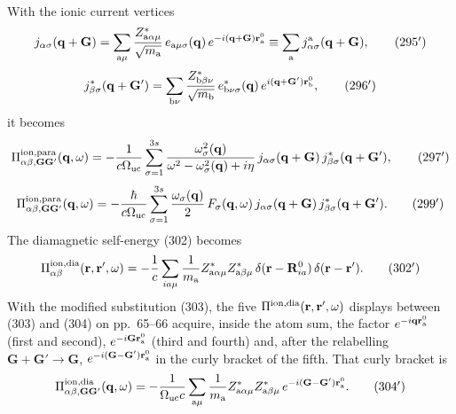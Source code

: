 \documentclass[11pt]{article}
\begin{document}
With the ionic current vertices
\begin{equation*}
j_{\alpha\sigma}(\mathbf q+\mathbf G)=\sum_{{\rm a}\mu}\frac{Z^*_{{\rm a}\alpha\mu}}{\sqrt{m_{\rm a}}}\,
e_{{\rm a}\mu\sigma}(\mathbf q)\,e^{-i(\mathbf q+\mathbf G)\mathbf r^0_{\rm a}}
\equiv\sum_{\rm a}j^{\rm a}_{\alpha\sigma}(\mathbf q+\mathbf G),\tag{295$'$}
\end{equation*}
\begin{equation*}
j^*_{\beta\sigma}(\mathbf q+\mathbf G')=\sum_{{\rm b}\nu}\frac{Z^*_{{\rm b}\beta\nu}}{\sqrt{m_{\rm b}}}\,
e^*_{{\rm b}\nu\sigma}(\mathbf q)\,e^{i(\mathbf q+\mathbf G')\mathbf r^0_{\rm b}},\tag{296$'$}
\end{equation*}
it becomes
\begin{equation*}
\Pi^{\rm ion,para}_{\alpha\beta,\mathbf G\mathbf G'}(\mathbf q,\omega)=-\frac{1}{c\Omega_{\rm uc}}
\sum_{\sigma=1}^{3s}\frac{\omega^2_\sigma(\mathbf q)}{\omega^2-\omega^2_\sigma(\mathbf q)+i\eta}\,
j_{\alpha\sigma}(\mathbf q+\mathbf G)\,j^*_{\beta\sigma}(\mathbf q+\mathbf G'),\tag{297$'$}
\end{equation*}
\begin{equation*}
\Pi^{\rm ion,para}_{\alpha\beta,\mathbf G\mathbf G'}(\mathbf q,\omega)=-\frac{\hbar}{c\Omega_{\rm uc}}
\sum_{\sigma=1}^{3s}\frac{\omega_\sigma(\mathbf q)}{2}\,F_\sigma(\mathbf q,\omega)\,
j_{\alpha\sigma}(\mathbf q+\mathbf G)\,j^*_{\beta\sigma}(\mathbf q+\mathbf G').\tag{299$'$}
\end{equation*}
The diamagnetic self-energy (302) becomes
\begin{equation*}
\Pi^{\rm ion,dia}_{\alpha\beta}(\mathbf r,\mathbf r',\omega)=-\frac1c\sum_{ia\mu}\frac{1}{m_{\rm a}}
Z^*_{{\rm a}\alpha\mu}Z^*_{{\rm a}\beta\mu}\,\delta(\mathbf r-\mathbf R^0_{ia})\,\delta(\mathbf r-\mathbf r').\tag{302$'$}
\end{equation*}
With the modified substitution (303), the five $\Pi^{\rm ion,dia}(\mathbf r,\mathbf r',\omega)$ displays
between (303) and (304) on pp.~65--66 acquire, inside the atom sum, the factor
$e^{-i\mathbf q\mathbf r^0_{\rm a}}$ (first and second), $e^{-i\mathbf G\mathbf r^0_{\rm a}}$ (third and fourth)
and, after the relabelling $\mathbf G+\mathbf G'\to\mathbf G$, $e^{-i(\mathbf G-\mathbf G')\mathbf r^0_{\rm a}}$ in
the curly bracket of the fifth. That curly bracket is
\begin{equation*}
\Pi^{\rm ion,dia}_{\alpha\beta,\mathbf G\mathbf G'}(\mathbf q,\omega)=-\frac{1}{\Omega_{\rm uc}c}
\sum_{{\rm a}\mu}\frac{1}{m_{\rm a}}Z^*_{{\rm a}\alpha\mu}Z^*_{{\rm a}\beta\mu}\,
e^{-i(\mathbf G-\mathbf G')\mathbf r^0_{\rm a}}.\tag{304$'$}
\end{equation*}
\end{document}
